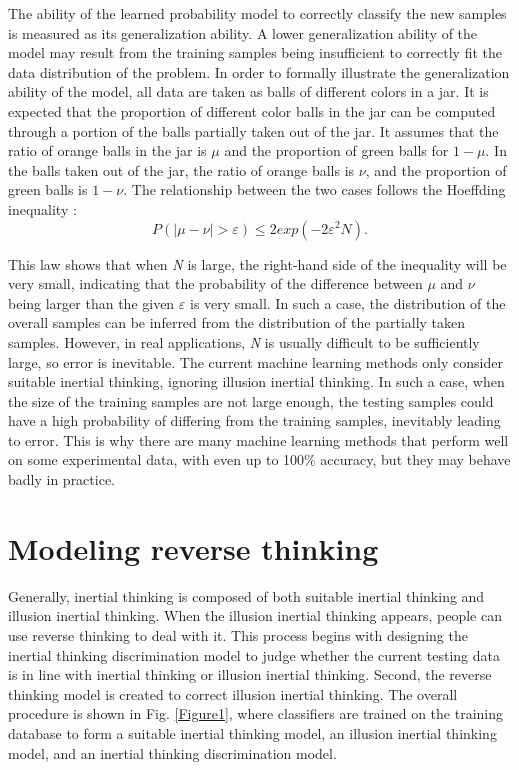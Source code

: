 The ability of the learned probability model to correctly classify the new samples is measured as its generalization ability. A lower generalization ability of the model may result from the training samples being insufficient to correctly fit the data distribution of the problem.
In order to formally illustrate the generalization ability of the model, all data are taken as balls of different colors in a jar. It is expected that the proportion of different color balls in the jar can be computed through a portion of the balls partially taken out of the jar. It assumes that the ratio of orange balls in the jar is $\mu$ and the proportion of green balls for $1-\mu$. In the balls taken out of the jar, the ratio of orange balls is $\nu$, and the proportion of green balls is $1-\nu$. The relationship between the two cases follows the Hoeffding inequality \cite{Hoeffding1963}:
\begin{equation}
P(|\mu-\nu|>\varepsilon)\leq 2exp(-2\varepsilon^2N).
\end{equation}

This law shows that when \emph{N} is large, the right-hand side of the inequality will be very small, indicating that the probability of the difference between $\mu$ and $\nu$ being larger than the given $\varepsilon$ is very small. In such a case, the distribution of the overall samples can be inferred from the distribution of the partially taken samples. However, in real applications, \emph{N} is usually difficult to be sufficiently large, so error is inevitable.
The current machine learning methods only consider suitable inertial thinking, ignoring illusion inertial thinking. In such a case, when the size of the training samples are not large enough, the testing samples could have a high probability of differing from the training samples, inevitably leading to error. This is why there are many machine learning methods that perform well on some experimental data, with even up to 100\% accuracy, but they may behave badly in practice.

\section{Modeling reverse thinking}
Generally, inertial thinking is composed of both suitable inertial thinking and illusion inertial thinking. When the illusion inertial thinking appears, people can use reverse thinking to deal with it. This process begins with designing the inertial thinking discrimination model to judge whether the current testing data is in line with inertial thinking or illusion inertial thinking. Second, the reverse thinking model is created to correct illusion inertial thinking. The overall procedure is shown in Fig. \ref{Figure1}, where classifiers are trained on the training database to form a suitable inertial thinking model, an illusion inertial thinking model, and an inertial thinking discrimination model.

